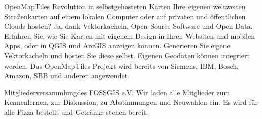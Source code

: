 %
{OpenMapTiles}%
{Revolution in selbstgehosteten Karten}%
{%
Ihre eigenen weltweiten Straßenkarten auf einem lokalen Computer oder auf privaten und öffentlichen
Clouds hosten? Ja, dank Vektorkacheln, Open-Source-Software und Open Data. Erfahren Sie, wie Sie
Karten mit eigenem Design in Ihren Websiten und mobilen Apps, oder in QGIS und ArcGIS anzeigen
können. Generieren Sie eigene Vektorkacheln und hosten Sie diese selbst. Eigenen Geodaten können
integriert werden. Das OpenMapTiles-Projekt wird bereits von Siemens, IBM, Bosch, Amazon, SBB und
anderen angewendet.%
}

\abstractZwei{}%
{Mitgliederversammlung\linebreak des FOSSGIS e.V.}%
{}%
{%
Wir laden alle Mitglieder zum
Kennenlernen, zur Diskussion, zu Abstimmungen und Neuwahlen ein. Es wird für alle Pizza bestellt und Getränke
stehen bereit.%
}
